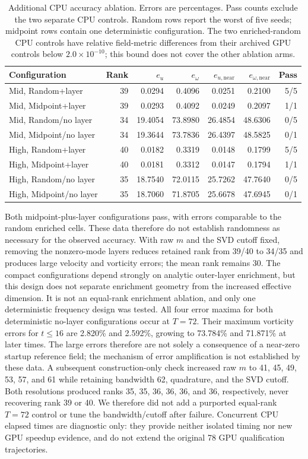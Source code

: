 \begin{table}[htbp]
\centering\small
\caption{Additional CPU accuracy ablation. Errors are percentages. Pass counts
exclude the two separate CPU controls. Random rows report the worst of five
seeds; midpoint rows contain one deterministic configuration. The two enriched-random CPU controls have relative field-metric differences from their archived GPU controls below $2.0\times10^{-10}$; this bound does not cover the other ablation arms.}
\label{tab:review-ablation}
\begin{tabular}{lrrrrrr}
\hline
Configuration & Rank & $e_u$ & $e_\omega$ & $e_{u,\mathrm{near}}$ & $e_{\omega,\mathrm{near}}$ & Pass \\
\hline
Mid, Random+layer & 39 & 0.0294 & 0.4096 & 0.0251 & 0.2100 & 5/5 \\
Mid, Midpoint+layer & 39 & 0.0293 & 0.4092 & 0.0249 & 0.2097 & 1/1 \\
Mid, Random/no layer & 34 & 19.4054 & 73.8980 & 26.4854 & 48.6306 & 0/5 \\
Mid, Midpoint/no layer & 34 & 19.3644 & 73.7836 & 26.4397 & 48.5825 & 0/1 \\
High, Random+layer & 40 & 0.0182 & 0.3319 & 0.0148 & 0.1799 & 5/5 \\
High, Midpoint+layer & 40 & 0.0181 & 0.3312 & 0.0147 & 0.1794 & 1/1 \\
High, Random/no layer & 35 & 18.7540 & 72.0115 & 25.7262 & 47.7640 & 0/5 \\
High, Midpoint/no layer & 35 & 18.7060 & 71.8705 & 25.6678 & 47.6945 & 0/1 \\
\hline
\end{tabular}
\end{table}

Both midpoint-plus-layer configurations pass, with errors comparable to the
random enriched cells. These data therefore do not establish randomness as
necessary for the observed accuracy. With raw $m$ and the SVD cutoff fixed,
removing the nonzero-mode layers reduces retained rank from 39/40 to 34/35 and
produces large velocity and vorticity errors; the mean rank remains 30.
The compact configurations depend strongly on analytic outer-layer enrichment,
but this design does not separate enrichment geometry from the increased
effective dimension. It is not an equal-rank enrichment ablation, and only one
deterministic frequency design was tested. All four error maxima for both
deterministic no-layer configurations occur at $T=72$. Their maximum vorticity
errors for $t\leq16$ are 2.820\% and 2.592\%, growing to 73.784\% and 71.871\%
at later times. The large errors therefore are not solely a consequence of a
near-zero startup reference field; the mechanism of error amplification is
not established by these data. A subsequent construction-only check increased raw $m$ to
41, 45, 49, 53, 57, and 61 while retaining bandwidth 62, quadrature, and the
SVD cutoff. Both resolutions produced ranks 35, 35, 36, 36, 36, and 36,
respectively, never recovering rank 39 or 40. We therefore did not add a
purported equal-rank $T=72$ control or tune the bandwidth/cutoff after failure.
Concurrent CPU elapsed times are
diagnostic only: they provide neither isolated timing nor new GPU speedup
evidence, and do not extend the original 78 GPU qualification trajectories.




